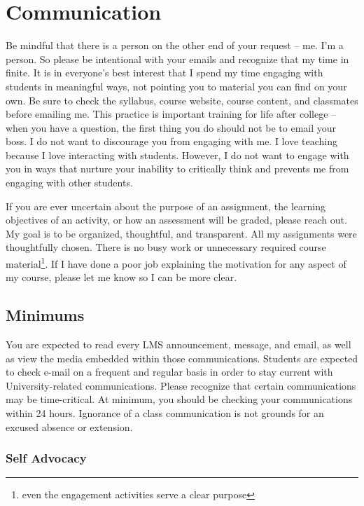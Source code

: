 \hypertarget{communication}{%
\chapter{Communication}\label{communication}}

Be mindful that there is a person on the other end of your request -- me. I'm a person. So please be intentional with your emails and recognize that my time in finite. It is in everyone's best interest that I spend my time engaging with students in meaningful ways, not pointing you to material you can find on your own. Be sure to check the syllabus, course website, course content, and classmates before emailing me. This practice is important training for life after college -- when you have a question, the first thing you do should not be to email your boss. I do not want to discourage you from engaging with me. I love teaching because I love interacting with students. However, I do not want to engage with you in ways that nurture your inability to critically think and prevents me from engaging with other students.

If you are ever uncertain about the purpose of an assignment, the learning objectives of an activity, or how an assessment will be graded, please reach out. My goal is to be organized, thoughtful, and transparent. All my assignments were thoughtfully chosen. There is no busy work or unnecessary required course material\footnote{even the engagement activities serve a clear purpose}. If I have done a poor job explaining the motivation for any aspect of my course, please let me know so I can be more clear.

\hypertarget{minimums}{%
\section{Minimums}\label{minimums}}

You are expected to read every LMS announcement, message, and email, as well as view the media embedded within those communications. Students are expected to check e-mail on a frequent and regular basis in order to stay current with University-related communications. Please recognize that certain communications may be time-critical. At minimum, you should be checking your communications within 24 hours. Ignorance of a class communication is not grounds for an excused absence or extension.

\hypertarget{self-advocacy-1}{%
\subsection{Self Advocacy}\label{self-advocacy-1}}

